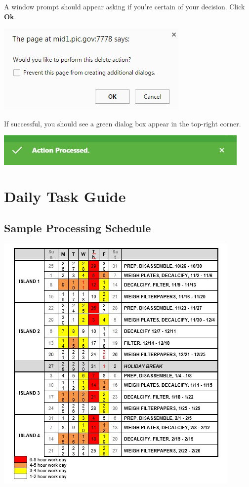 \documentclass[]{book}
\begin{document}
A window prompt should appear asking if you're certain of your decision. Click \textbf{Ok}.

\includegraphics{images/Data24.jpg}

If successful, you should see a green dialog box appear in the top-right corner.

\includegraphics{images/Data25.jpg}

\hypertarget{daily-task-guide}{%
\section{Daily Task Guide}\label{daily-task-guide}}

\hypertarget{sample-processing-schedule}{%
\subsection{Sample Processing Schedule}\label{sample-processing-schedule}}

\includegraphics{images/DailyTasks1.jpg}
\end{document}
